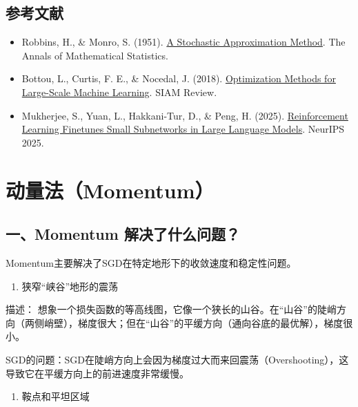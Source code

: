 \hypertarget{ux53c2ux8003ux6587ux732e-23}{%
\subsection{参考文献}\label{ux53c2ux8003ux6587ux732e-23}}

\begin{itemize}
\tightlist
\item
  Robbins, H., \& Monro, S. (1951). \href{https://doi.org/10.1214/aoms/1177729586}{A Stochastic Approximation Method}. The Annals of Mathematical Statistics.
\item
  Bottou, L., Curtis, F. E., \& Nocedal, J. (2018). \href{https://epubs.siam.org/doi/10.1137/16M1080173}{Optimization Methods for Large-Scale Machine Learning}. SIAM Review.
\item
  Mukherjee, S., Yuan, L., Hakkani-Tur, D., \& Peng, H. (2025). \href{https://arxiv.org/abs/2505.11711}{Reinforcement Learning Finetunes Small Subnetworks in Large Language Models}. NeurIPS 2025.
\end{itemize}

\clearpage

\hypertarget{ux52a8ux91cfux6cd5momentum}{%
\section{动量法（Momentum）}\label{ux52a8ux91cfux6cd5momentum}}

\hypertarget{ux4e00momentum-ux89e3ux51b3ux4e86ux4ec0ux4e48ux95eeux9898}{%
\subsection{一、Momentum 解决了什么问题？}\label{ux4e00momentum-ux89e3ux51b3ux4e86ux4ec0ux4e48ux95eeux9898}}

Momentum主要解决了SGD在特定地形下的收敛速度和稳定性问题。

\begin{enumerate}
\def\labelenumi{\arabic{enumi}.}
\tightlist
\item
  狭窄``峡谷''地形的震荡
\end{enumerate}

描述： 想象一个损失函数的等高线图，它像一个狭长的山谷。在``山谷''的陡峭方向（两侧峭壁），梯度很大；但在``山谷''的平缓方向（通向谷底的最优解），梯度很小。

SGD的问题：SGD在陡峭方向上会因为梯度过大而来回震荡（Overshooting），这导致它在平缓方向上的前进速度非常缓慢。

\begin{enumerate}
\def\labelenumi{\arabic{enumi}.}
\setcounter{enumi}{1}
\tightlist
\item
  鞍点和平坦区域
\end{enumerate}

